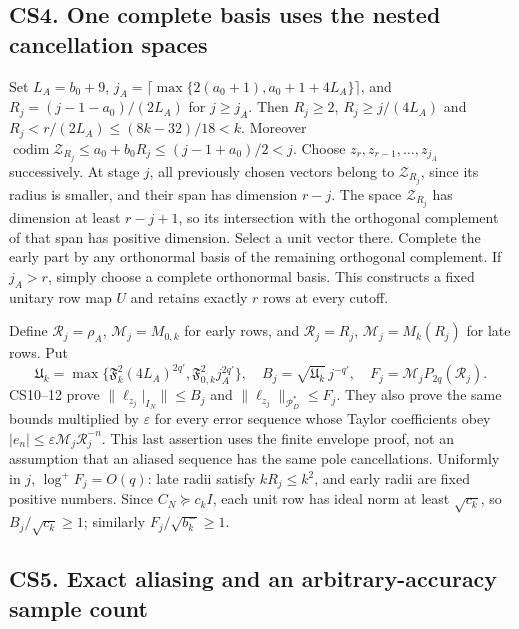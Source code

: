 \documentclass[11pt]{article}
\begin{document}
\subsection{CS4. One complete basis uses the nested cancellation spaces}\label{cs4.-one-complete-basis-uses-the-nested-cancellation-spaces}

Set \(L_A=b_0+9\), \(j_A=\lceil\max\{2(a_0+1),a_0+1+4L_A\}\rceil\), and \(R_j=(j-1-a_0)/(2L_A)\) for \(j\ge j_A\). Then \(R_j\ge2\), \(R_j\ge j/(4L_A)\) and \(R_j<r/(2L_A)\le(8k-32)/18<k\). Moreover \(\operatorname{codim}\mathcal Z_{R_j}\le a_0+b_0R_j\le(j-1+a_0)/2<j\). Choose \(z_r,z_{r-1},\ldots,z_{j_A}\) successively. At stage \(j\), all previously chosen vectors belong to \(\mathcal Z_{R_j}\), since its radius is smaller, and their span has dimension \(r-j\). The space \(\mathcal Z_{R_j}\) has dimension at least \(r-j+1\), so its intersection with the orthogonal complement of that span has positive dimension. Select a unit vector there. Complete the early part by any orthonormal basis of the remaining orthogonal complement. If \(j_A>r\), simply choose a complete orthonormal basis. This constructs a fixed unitary row map \(U\) and retains exactly \(r\) rows at every cutoff.

Define \(\mathcal R_j=\rho_A\), \(\mathcal M_j=M_{0,k}\) for early rows, and \(\mathcal R_j=R_j\), \(\mathcal M_j=M_k(R_j)\) for late rows. Put \[
 \mathfrak U_k=\max\{\mathfrak F_k^2(4L_A)^{2q'},\mathfrak F_{0,k}^2j_A^{2q'}\},
 \quad B_j=\sqrt{\mathfrak U_k}\,j^{-q'},\quad F_j=\mathcal M_jP_{2q}(\mathcal R_j).
 \tag{CS13}
\] CS10--12 prove \(\|\ell_{z_j}|_{I_N}\|\le B_j\) and \(\|\ell_{z_j}\|_{\mathcal P_D^*}\le F_j\). They also prove the same bounds multiplied by \(\varepsilon\) for every error sequence whose Taylor coefficients obey \(|e_n|\le\varepsilon\mathcal M_j\mathcal R_j^{-n}\). This last assertion uses the finite envelope proof, not an assumption that an aliased sequence has the same pole cancellations. Uniformly in \(j\), \(\log^+F_j=O(q)\): late radii satisfy \(kR_j\le k^2\), and early radii are fixed positive numbers. Since \(C_N\succeq c_kI\), each unit row has ideal norm at least \(\sqrt{c_k}\), so \(B_j/\sqrt{c_k}\ge1\); similarly \(F_j/\sqrt{b_k^-}\ge1\).

\subsection{CS5. Exact aliasing and an arbitrary-accuracy sample count}\label{cs5.-exact-aliasing-and-an-arbitrary-accuracy-sample-count}
\end{document}
